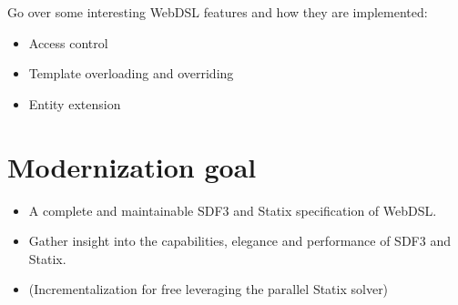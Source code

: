      Go over some interesting WebDSL features and how they are implemented:
      \begin{itemize}
        \item Access control
        \item Template overloading and overriding
        \item Entity extension
      \end{itemize}

  \section{\label{sec:modernization}Modernization goal}

    \begin{itemize}
      \item A complete and maintainable SDF3 and Statix specification of WebDSL.
      \item Gather insight into the capabilities, elegance and performance of SDF3 and Statix.
      \item (Incrementalization for free leveraging the parallel Statix solver)
    \end{itemize}
